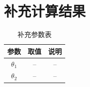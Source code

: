 \documentclass[UTF8,fontset=none,a4paper,12pt]{ctexart}
\begin{document}
\section{补充计算结果}


\begin{table}[H]
  \centering
  \caption{补充参数表}
  \begin{tabular}{ccc}
    \toprule
    参数 & 取值 & 说明 \\
    \midrule
    $\theta_1$ & -- & -- \\
    $\theta_2$ & -- & -- \\
    \bottomrule
  \end{tabular}
\end{table}

%
\end{document}
